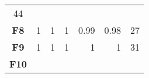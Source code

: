 \documentclass[12pt,a4paper]{article}
\begin{document}
\begin{longtable}[c]{@{}crrrrrr@{}}
\begin{minipage}[t]{0.07\columnwidth}
44
\strut\end{minipage}\tabularnewline
\begin{minipage}[t]{0.11\columnwidth}\centering\strut
\textbf{F8}
\strut\end{minipage} &
\begin{minipage}[t]{0.07\columnwidth}\raggedleft\strut
1
\strut\end{minipage} &
\begin{minipage}[t]{0.08\columnwidth}\raggedleft\strut
1
\strut\end{minipage} &
\begin{minipage}[t]{0.09\columnwidth}\raggedleft\strut
1
\strut\end{minipage} &
\begin{minipage}[t]{0.10\columnwidth}\raggedleft\strut
0.99
\strut\end{minipage} &
\begin{minipage}[t]{0.11\columnwidth}\raggedleft\strut
0.98
\strut\end{minipage} &
\begin{minipage}[t]{0.07\columnwidth}\raggedleft\strut
27
\strut\end{minipage}\tabularnewline
\begin{minipage}[t]{0.11\columnwidth}\centering\strut
\textbf{F9}
\strut\end{minipage} &
\begin{minipage}[t]{0.07\columnwidth}\raggedleft\strut
1
\strut\end{minipage} &
\begin{minipage}[t]{0.08\columnwidth}\raggedleft\strut
1
\strut\end{minipage} &
\begin{minipage}[t]{0.09\columnwidth}\raggedleft\strut
1
\strut\end{minipage} &
\begin{minipage}[t]{0.10\columnwidth}\raggedleft\strut
1
\strut\end{minipage} &
\begin{minipage}[t]{0.11\columnwidth}\raggedleft\strut
1
\strut\end{minipage} &
\begin{minipage}[t]{0.07\columnwidth}\raggedleft\strut
31
\strut\end{minipage}\tabularnewline
\begin{minipage}[t]{0.11\columnwidth}\centering\strut
\textbf{F10}
\strut\end{minipage} &
\begin{minipage}[t]{0.07\columnwidth}\raggedleft\strut

\end{minipage}
\end{longtable}
\end{document}
